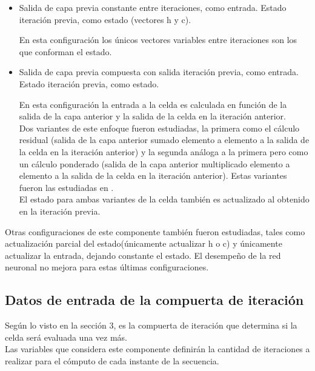 \documentclass{article}
\begin{document}
\begin{itemize}

\item Salida de capa previa constante entre iteraciones, como entrada. Estado iteración previa, como estado (vectores h y c).


En esta configuración los únicos vectores variables entre iteraciones son los que conforman el estado.


\item Salida de capa previa compuesta con salida iteración previa, como entrada. Estado iteración previa, como estado.


En esta configuración la entrada a la celda es calculada en función de la salida de la capa anterior y la salida de la celda en la iteración anterior.\\


Dos variantes de este enfoque fueron estudiadas, la primera como el cálculo residual (salida de la capa anterior sumado elemento a elemento a la salida de la celda en la iteración anterior) y la segunda análoga a la primera pero como un cálculo ponderado (salida de la capa anterior multiplicado elemento a elemento a la salida de la celda en la iteración anterior). Estas variantes fueron las estudiadas en \cite{loopyRNN}.\\


El estado para ambas variantes de la celda también es actualizado al obtenido en la iteración previa.

\end{itemize}


Otras configuraciones de este componente también fueron estudiadas, tales como actualización parcial del estado(únicamente actualizar h o c) y únicamente actualizar la entrada, dejando constante el estado.
El desempeño de la red neuronal no mejora para estas últimas configuraciones.


\subsection{Datos de entrada de la compuerta de iteración}
Según lo visto en la sección 3, es la compuerta de iteración que determina si la celda será evaluada una vez más.\\

Las variables que considera este componente definirán la cantidad de iteraciones a realizar para el cómputo de cada instante de la secuencia.\\
\end{document}
